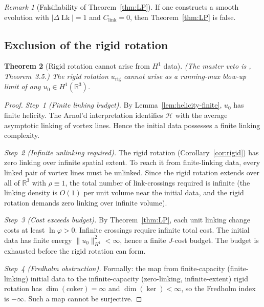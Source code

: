 \documentclass[12pt, reqno]{amsart}
\newtheorem{theorem}{Theorem}[section]
\theoremstyle{definition}
\theoremstyle{remark}
\newtheorem{remark}[theorem]{Remark}
\numberwithin{equation}{section}
\newcommand{\R}{\mathbb{R}}
\newcommand{\Jc}{J}
\newcommand{\step}[1]{\par\medskip\noindent\textit{Step~#1.}\enspace}
\begin{document}
\begin{remark}[Falsifiability of Theorem~\ref{thm:LP}]
If one constructs a smooth evolution with
$|\Delta\!\operatorname{Lk}|=1$ and $C_{\mathrm{link}}=0$, then
Theorem~\ref{thm:LP} is false.
\end{remark}

\subsection{Exclusion of the rigid rotation}

\begin{theorem}[Rigid rotation cannot arise from $H^1$ data]%
\label{thm:no-rigid}
\textup{(}The master veto is \cite{F6Veto}, Theorem~3.5.\textup{)}
The rigid rotation
$u_{\mathrm{rig}}$ cannot arise as a running-max blow-up limit of any
$u_0\in H^1(\R^3)$.
\end{theorem}
\begin{proof}
\step{1 (Finite linking budget)}
By Lemma~\ref{lem:helicity-finite}, $u_0$ has finite helicity.
The Arnol'd interpretation identifies $\mathcal H$ with the
average asymptotic linking of vortex lines.  Hence the initial data
possesses a finite linking complexity.

\step{2 (Infinite unlinking required)}
The rigid rotation (Corollary~\ref{cor:rigid}) has zero linking over
infinite spatial extent.  To reach it from finite-linking data, every
linked pair of vortex lines must be unlinked.  Since the rigid rotation
extends over all of $\R^3$ with $\rho\equiv 1$, the total number of
link-crossings required is infinite (the linking density is $O(1)$ per
unit volume near the initial data, and the rigid rotation demands
zero linking over infinite volume).

\step{3 (Cost exceeds budget)}
By Theorem~\ref{thm:LP}, each unit linking change costs at least
$\ln\varphi>0$.
Infinite crossings require infinite total cost.
The initial data has finite energy $\|u_0\|_{H^1}^2<\infty$, hence a
finite $\Jc$-cost budget.  The budget is exhausted before the rigid
rotation can form.

\step{4 (Fredholm obstruction)}
Formally: the map from finite-capacity (finite-linking) initial data
to the infinite-capacity (zero-linking, infinite-extent) rigid rotation
has $\dim(\mathrm{coker})=\infty$ and $\dim(\ker)<\infty$, so the
Fredholm index is $-\infty$.  Such a map cannot be surjective.
\end{proof}

\end{document}
